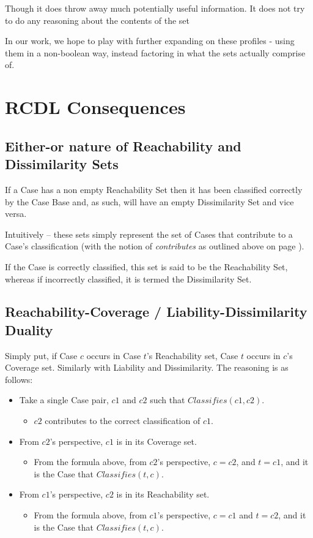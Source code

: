 \documentclass[a4paper,11pt]{report}
\begin{document}
Though it does throw away much potentially useful information. It does not try to do any reasoning about the contents of the set

In our work, we hope to play with further expanding on these profiles - using them in a non-boolean way, instead factoring in what the sets actually comprise of.

\section{RCDL Consequences}

\subsection{Either-or nature of Reachability and Dissimilarity Sets}
If a Case has a non empty Reachability Set then it has been classified correctly by the Case Base and, as such, will have an empty Dissimilarity Set and vice versa.

Intuitively – these sets simply represent the set of Cases that contribute to a Case's classification (with the notion of \emph{contributes} as outlined above on page \pageref{sec:contributes}). 

If the Case is correctly classified, this set is said to be the Reachability Set, whereas if incorrectly classified, it is termed the Dissimilarity Set.

\subsection{Reachability-Coverage / Liability-Dissimilarity Duality}
Simply put, if Case $c$ occurs in Case $t$'s Reachability set, Case $t$ occurs in $c$'s Coverage set. Similarly with Liability and Dissimilarity.
The reasoning is as follows:
\begin{itemize}
	\item Take a single Case pair, $c1$ and $c2$ such that $Classifies(c1, c2)$.
	\begin{itemize}
		\item $c2$ contributes to the correct classification of $c1$.
	\end{itemize}
	\item From $c2$'s perspective, $c1$ is in its Coverage set.
	\begin{itemize}
		\item From the formula above, from $c2$'s perspective, $c=c2$, and $t=c1$, and it is the Case that $Classifies(t, c)$.
	\end{itemize}
	\item From $c1$'s perspective, $c2$ is in its Reachability set.
	\begin{itemize}
		\item From the formula above, from $c1$'s perspective, $c=c1$ and $t=c2$, and it is the Case that $Classifies(t, c)$.
	\end{itemize}
\end{itemize}
\end{document}
